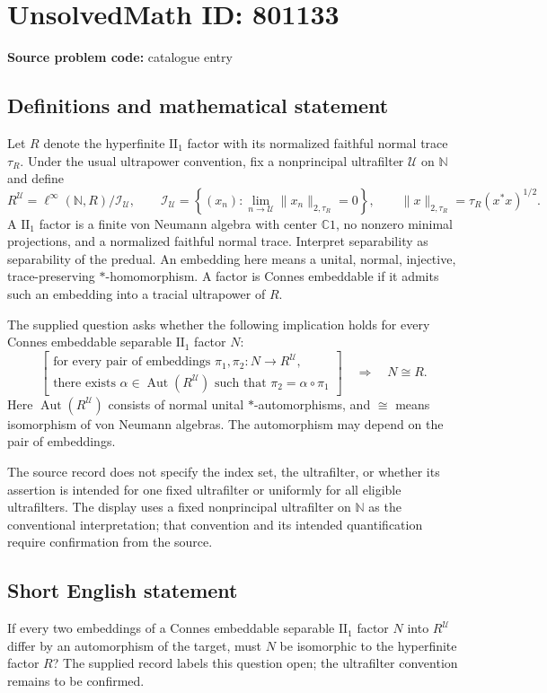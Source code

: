 \documentclass[11pt]{article}
\newcommand{\N}{\mathbb{N}}
\newcommand{\C}{\mathbb{C}}
\begin{document}
\section*{UnsolvedMath ID: 801133}
\textbf{Source problem code:} catalogue entry
\subsection{Definitions and mathematical statement}
Let \(R\) denote the hyperfinite \(\mathrm{II}_1\) factor with its normalized faithful normal trace \(\tau_R\). Under the usual ultrapower convention, fix a nonprincipal ultrafilter \(\mathcal U\) on \(\N\) and define
\[
R^{\mathcal U}=\ell^\infty(\N,R)\big/\mathcal I_{\mathcal U},\qquad
\mathcal I_{\mathcal U}=\left\{(x_n):\lim_{n\to\mathcal U}\|x_n\|_{2,\tau_R}=0\right\},\qquad
\|x\|_{2,\tau_R}=\tau_R(x^*x)^{1/2}.
\]
A \(\mathrm{II}_1\) factor is a finite von Neumann algebra with center \(\C1\), no nonzero minimal projections, and a normalized faithful normal trace. Interpret separability as separability of the predual. An embedding here means a unital, normal, injective, trace-preserving \(*\)-homomorphism. A factor is Connes embeddable if it admits such an embedding into a tracial ultrapower of \(R\).

The supplied question asks whether the following implication holds for every Connes embeddable separable \(\mathrm{II}_1\) factor \(N\):
\[
\left[
\begin{gathered}
\text{for every pair of embeddings }\pi_1,\pi_2:N\longrightarrow R^{\mathcal U},\\
\text{there exists }\alpha\in\operatorname{Aut}(R^{\mathcal U})
\text{ such that }\pi_2=\alpha\circ\pi_1
\end{gathered}
\right]
\quad\Longrightarrow\quad N\cong R.
\]
Here \(\operatorname{Aut}(R^{\mathcal U})\) consists of normal unital \(*\)-automorphisms, and \(\cong\) means isomorphism of von Neumann algebras. The automorphism may depend on the pair of embeddings.

The source record does not specify the index set, the ultrafilter, or whether its assertion is intended for one fixed ultrafilter or uniformly for all eligible ultrafilters. The display uses a fixed nonprincipal ultrafilter on \(\N\) as the conventional interpretation; that convention and its intended quantification require confirmation from the source.
\subsection{Short English statement}
If every two embeddings of a Connes embeddable separable \(\mathrm{II}_1\) factor \(N\) into \(R^{\mathcal U}\) differ by an automorphism of the target, must \(N\) be isomorphic to the hyperfinite factor \(R\)? The supplied record labels this question open; the ultrafilter convention remains to be confirmed.
\end{document}
